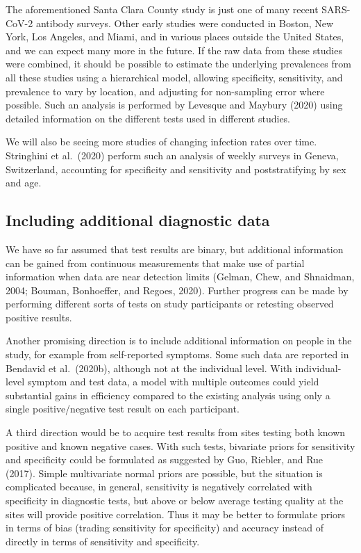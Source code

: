 \documentclass[11pt]{article}
\begin{document}
The aforementioned Santa Clara County study is just one of many recent
SARS-CoV-2 antibody surveys.  Other early studies were conducted in
Boston, New York, Los Angeles, and Miami, and in various places
outside the United States, and we can expect many more in the future.
If the raw data from these studies were combined, it should be
possible to estimate the underlying prevalences from all these studies
using a hierarchical model, allowing specificity, sensitivity, and
prevalence to vary by location, and adjusting for non-sampling error
where possible.  Such an analysis is performed by Levesque and Maybury
(2020) using detailed information on the different tests used in
different studies.

We will also be seeing more studies of changing infection rates over
time.  Stringhini et al.\ (2020) perform such an analysis of weekly
surveys in Geneva, Switzerland, accounting for specificity and
sensitivity and poststratifying by sex and age.

\subsection{Including additional diagnostic data}

We have so far assumed that test results are binary, but additional
information can be gained from continuous measurements that make use
of partial information when data are near detection limits (Gelman,
Chew, and Shnaidman, 2004; Bouman, Bonhoeffer, and Regoes, 2020).
Further progress can be made by performing different sorts of tests on
study participants or retesting observed positive results.

Another promising direction is to include additional information on
people in the study, for example from self-reported symptoms.  Some
such data are reported in Bendavid et al.\ (2020b), although not at
the individual level. With individual-level symptom and test data, a
model with multiple outcomes could yield substantial gains in
efficiency compared to the existing analysis using only a single
positive/negative test result on each participant.

A third direction would be to acquire test results from sites testing
both known positive and known negative cases.  With such tests,
bivariate priors for sensitivity and specificity could be formulated
as suggested by Guo, Riebler, and Rue (2017).  Simple multivariate
normal priors are possible, but the situation is complicated because,
in general, sensitivity is negatively correlated with specificity in
diagnostic tests, but above or below average testing quality at the
sites will provide positive correlation.  Thus it may be better to
formulate priors in terms of bias (trading sensitivity for
specificity) and accuracy instead of directly in terms of sensitivity
and specificity.
\end{document}
